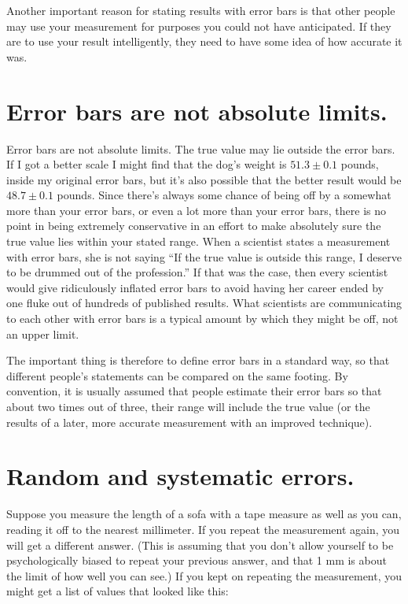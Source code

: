 Another important reason for stating results with error bars
is that other people may use your measurement for purposes
you could not have anticipated. If they are to use your
result intelligently, they need to have some idea of
how accurate it was.

\section*{Error bars are not absolute limits.}

	Error bars are not absolute limits. The true value may lie
outside the error bars. If I got a better scale I might find
that the dog's weight is $51.3\pm0.1$ pounds, inside my
original error bars, but it's also possible that the better
result would be $48.7\pm0.1$ pounds. Since there's always some
chance of being off by a somewhat more than your error bars,
or even a lot more than your error bars, there is no point
in being extremely conservative in an effort to make
absolutely sure the true value lies within your stated
range. When a scientist states a measurement with error
bars, she is not saying ``If the true value is outside this
range, I deserve to be drummed out of the profession.'' If
that was the case, then every scientist would give
ridiculously inflated error bars to avoid having her career
ended by one fluke out of hundreds of published results.
What scientists are communicating to each other with error
bars is a typical amount by which they might be off, not an upper limit.

	The important thing is therefore to define error bars in a
standard way, so that different people's statements can be
compared on the same footing. By convention, it is usually
assumed that people estimate their error bars so that about
two times out of three, their range will include the true
value (or the results of a later, more accurate measurement
with an improved technique).

\section*{Random and systematic errors.}

	Suppose you measure the length of a sofa with a tape
measure as well as you can, reading it off to the nearest
millimeter. If you repeat the measurement again, you will
get a different answer. (This is assuming that you don't
allow yourself to be psychologically biased to repeat your
previous answer, and that 1 mm is about the limit of how
well you can see.) If you kept on repeating the measurement,
you might get a list of values that looked like this:

